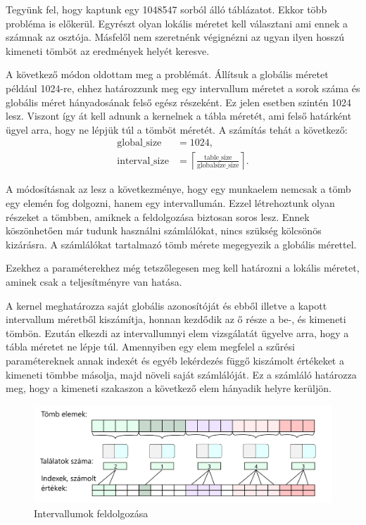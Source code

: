 \newpage


Tegyünk fel, hogy kaptunk egy 1048547 sorból álló táblázatot. Ekkor több probléma is előkerül. Egyrészt olyan lokális méretet kell választani ami ennek a számnak az osztója. Másfelől nem szeretnénk végignézni az ugyan ilyen hosszú kimeneti tömböt az eredmények helyét keresve.

A következő módon oldottam meg a problémát. Állítsuk a globális méretet például 1024-re, ehhez határozzunk meg egy intervallum méretet a sorok száma és globális méret hányadosának felső egész részeként. Ez jelen esetben szintén 1024 lesz. Viszont így át kell adnunk a kernelnek a tábla méretét, ami felső határként ügyel arra, hogy ne lépjük túl a tömböt méretét. A számítás tehát a következő:
\begin{align*}
\text{global\_size} &= 1024, \\
\text{interval\_size} &=
\left\lceil \frac{\text{table\_size}}{\text{globalsize\_size}} \right\rceil.
\end{align*}

A módosításnak az lesz a következménye, hogy egy munkaelem nemcsak a tömb egy elemén fog dolgozni, hanem egy intervallumán. Ezzel létrehoztunk olyan részeket a tömbben, amiknek a feldolgozása biztosan soros lesz. Ennek köszönhetően már tudunk használni számlálókat, nincs szükség kölcsönös kizárásra. A számlálókat tartalmazó tömb mérete megegyezik a globális mérettel.

Ezekhez a paraméterekhez még tetszőlegesen meg kell határozni a lokális méretet, aminek csak a teljesítményre van hatása.


A kernel meghatározza saját globális azonosítóját és ebből illetve a kapott intervallum méretből kiszámítja, honnan kezdődik az ő része a be-, és kimeneti tömbön. Ezután elkezdi az intervallumnyi elem vizsgálatát ügyelve arra, hogy a tábla méretet ne lépje túl. Amennyiben egy elem megfelel a szűrési paramétereknek annak indexét és egyéb lekérdezés függő kiszámolt értékeket a kimeneti tömbbe másolja, majd növeli saját számlálóját. Ez a számláló határozza meg, hogy a kimeneti szakaszon a következő elem hányadik helyre kerüljön.

\begin{figure}[h!]
\centering
\includegraphics[width=\textwidth]{images/itemgroup_black.png}
\caption{Intervallumok feldolgozása}
\label{fig:itemgroup_black}
\end{figure}

